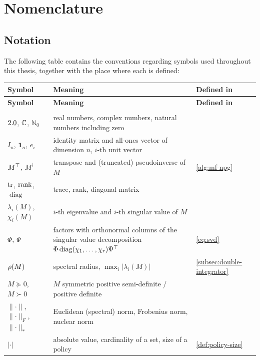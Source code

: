 \chapter{Nomenclature}
\label{app:nomenclature}

\section{Notation}
\label{sec:notation}

The following table contains the conventions regarding symbols
used throughout this thesis, together with the place where each is defined:

\begin{longtable}{@{}p{}p{}>{\raggedright\arraybackslash}p{}@{}}
\toprule
\textbf{Symbol} & \textbf{Meaning} & \textbf{Defined in} \\
\midrule
\endfirsthead
\toprule
\textbf{Symbol} & \textbf{Meaning} & \textbf{Defined in} \\
\midrule
\endhead
\bottomrule
\endfoot
\multicolumn{3}{@{}l}{\emph{Sets and operators}} \\[2pt]
$2.0$, $\mathbb{C}$, $\mathbb{N}_0$ & real numbers, complex numbers, natural numbers including zero & \\
$I_n$, $\mathbf{1}_n$, $e_i$ & identity matrix and all-ones vector of dimension $n$, $i$-th unit vector & \\
$M^{\top}$, $M^{\dagger}$ & transpose and (truncated) pseudoinverse of $M$ & \cref{alg:mf-npg} \\
$\operatorname{tr}$, $\operatorname{rank}$, $\operatorname{diag}$ & trace, rank, diagonal matrix & \\
$\lambda_i(M)$, $\chi_i(M)$ & $i$-th eigenvalue and $i$-th singular value of $M$ & \\
$\Phi$, $\Psi$ & factors with orthonormal columns of the singular value decomposition $\Phi \operatorname{diag}(\chi_1, \dots, \chi_r) \Psi^{\top}$ & \eqref{eq:svd} \\
$\operatorname{\rho}(M)$ & spectral radius, $\max_i \lvert \lambda_i(M) \rvert$ & \cref{subsec:double-integrator} \\
$M \succeq 0$, $M \succ 0$ & $M$ symmetric positive semi-definite / positive definite & \\
$\lVert \cdot \rVert$, $\lVert \cdot \rVert_F$, $\lVert \cdot \rVert_{*}$ & Euclidean (spectral) norm, Frobenius norm, nuclear norm & \\
$\lvert \cdot \rvert$ & absolute value, cardinality of a set, size of a policy & \cref{def:policy-size} \\

\end{longtable}
